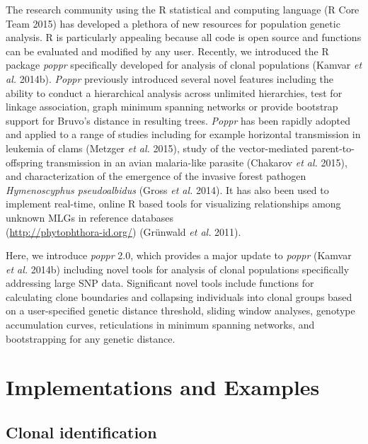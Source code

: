 \documentclass[double,12pt]{beavtex}
\begin{document}
  The research community using the R statistical and computing language (R
  Core Team 2015) has developed a plethora of new resources for population
  genetic analysis. R is particularly appealing because all code is open
  source and functions can be evaluated and modified by any user.
  Recently, we introduced the R package \emph{poppr} specifically
  developed for analysis of clonal populations (Kamvar \emph{et al.}
  2014b). \emph{Poppr} previously introduced several novel features
  including the ability to conduct a hierarchical analysis across
  unlimited hierarchies, test for linkage association, graph minimum
  spanning networks or provide bootstrap support for Bruvo's distance in
  resulting trees. \emph{Poppr} has been rapidly adopted and applied to a
  range of studies including for example horizontal transmission in
  leukemia of clams (Metzger \emph{et al.} 2015), study of the
  vector-mediated parent-to-offspring transmission in an avian
  malaria-like parasite (Chakarov \emph{et al.} 2015), and
  characterization of the emergence of the invasive forest pathogen
  \emph{Hymenoscyphus pseudoalbidus} (Gross \emph{et al.} 2014). It has
  also been used to implement real-time, online R based tools for
  visualizing relationships among unknown MLGs in reference databases\\
  (\url{http://phytophthora-id.org/}) (Grünwald \emph{et al.} 2011).
  
  Here, we introduce \emph{poppr} 2.0, which provides a major update to
  \emph{poppr} (Kamvar \emph{et al.} 2014b) including novel tools for
  analysis of clonal populations specifically addressing large SNP data.
  Significant novel tools include functions for calculating clone
  boundaries and collapsing individuals into clonal groups based on a
  user-specified genetic distance threshold, sliding window analyses,
  genotype accumulation curves, reticulations in minimum spanning
  networks, and bootstrapping for any genetic distance.
  
  \section{Implementations and
  Examples}\label{implementations-and-examples}
  
  \subsection{Clonal identification}\label{clonal-identification}
  
\end{document}
